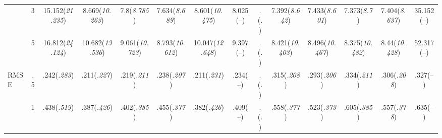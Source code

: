 \documentclass{article}
\begin{document}
\begin{table}[tbp]
{\begin{tabularx}{\textwidth}{lCCCCCCCCCCCCC}
&3&15.152\newline (\emph{21.235})&8.669\newline (\emph{10.263})&7.8\newline (\emph{8.785})&7.634\newline (\emph{8.689})&8.601\newline (\emph{10.475})&8.025\newline (--)&.\newline (\emph{.})&7.392\newline (\emph{8.642})&7.433\newline (\emph{8.601})&7.373\newline (\emph{8.7})&7.404\newline (\emph{8.637})&35.152\newline (--) \tabularnewline
&5&16.812\newline (\emph{24.124})&10.682\newline (\emph{13.536})&9.061\newline (\emph{10.723})&8.793\newline (\emph{10.612})&10.047\newline (\emph{12.648})&9.397\newline (--)&.\newline (\emph{.})&8.421\newline (\emph{10.403})&8.496\newline (\emph{10.467})&8.375\newline (\emph{10.482})&8.44\newline (\emph{10.428})&52.317\newline (--) \tabularnewline
\midrule RMSE&.5&.242\newline (\emph{.283})&.211\newline (\emph{.227})&.219\newline (\emph{.211})&.238\newline (\emph{.207})&.211\newline (\emph{.231})&.234\newline (--)&.\newline (\emph{.})&.315\newline (\emph{.208})&.293\newline (\emph{.206})&.334\newline (\emph{.211})&.306\newline (\emph{.208})&.327\newline (--) \tabularnewline
&1&.438\newline (\emph{.519})&.387\newline (\emph{.426})&.402\newline (\emph{.385})&.455\newline (\emph{.377})&.382\newline (\emph{.426})&.409\newline (--)&.\newline (\emph{.})&.558\newline (\emph{.377})&.523\newline (\emph{.373})&.605\newline (\emph{.385})&.557\newline (\emph{.378})&.635\newline (--) \tabularnewline

\end{tabularx}}
\end{table}
\end{document}
